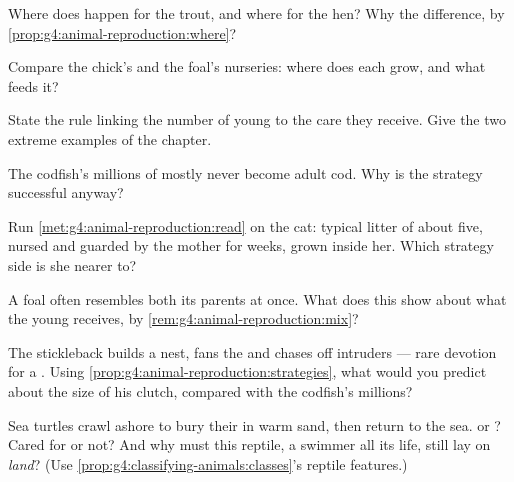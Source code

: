 \begin{exercise}[$\star$]\label{exo:g4:animal-reproduction:4}
Where does  happen for the trout, and where for
the hen? Why the difference, by
\cref{prop:g4:animal-reproduction:where}?
\end{exercise}

\begin{exercise}[$\star$]\label{exo:g4:animal-reproduction:5}
Compare the chick's and the foal's nurseries: where does each
grow, and what feeds it?
\end{exercise}

\begin{exercise}[$\star$]\label{exo:g4:animal-reproduction:6}
State the rule linking the number of young to the care they
receive. Give the two extreme examples of the chapter.
\end{exercise}

\begin{exercise}[$\star$]\label{exo:g4:animal-reproduction:7}
The codfish's millions of  mostly never become adult cod.
Why is the strategy successful anyway?
\end{exercise}

\begin{exercise}[$\star$]\label{exo:g4:animal-reproduction:8}
Run \cref{met:g4:animal-reproduction:read} on the cat: typical
litter of about five, nursed and guarded by the mother for
weeks, grown inside her. Which strategy side is she nearer to?
\end{exercise}

\begin{exercise}[$\star\star$]\label{exo:g4:animal-reproduction:9}
A foal often resembles both its parents at once. What does
this show about what the young receives, by
\cref{rem:g4:animal-reproduction:mix}?
\end{exercise}

\begin{exercise}[$\star\star$]\label{exo:g4:animal-reproduction:10}
The stickleback  builds a nest, fans the  and chases
off intruders --- rare devotion for a . Using
\cref{prop:g4:animal-reproduction:strategies}, what would you
predict about the size of his clutch, compared with the
codfish's millions?
\end{exercise}

\begin{exercise}[$\star\star\star$]\label{exo:g4:animal-reproduction:11}
Sea turtles crawl ashore to bury their  in warm sand, then
return to the sea.  or ? Cared for or not?
And why must this reptile, a swimmer all its life, still lay
on \emph{land}? (Use \cref{prop:g4:classifying-animals:classes}'s
reptile features.)
\end{exercise}
